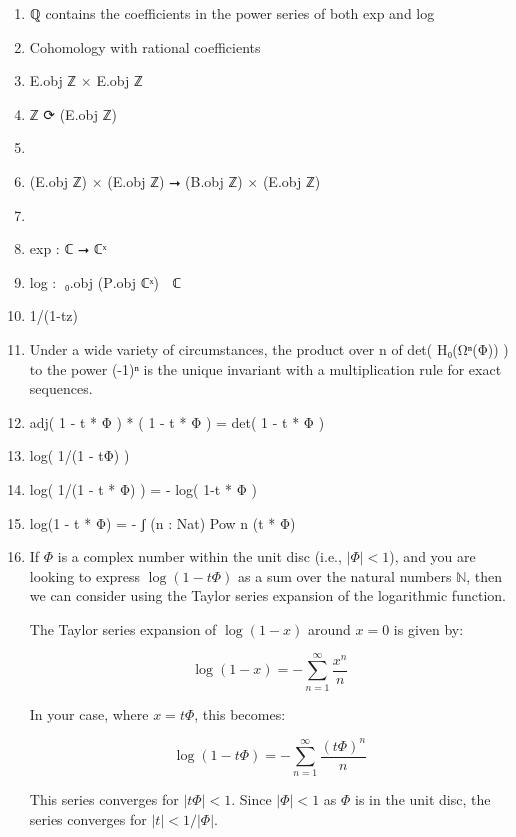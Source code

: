 \documentclass{book}
\begin{document}
\begin{enumerate}
\item ℚ contains the coefficients in the power series of both exp and log
\item Cohomology with rational coefficients
\item E.obj ℤ × E.obj ℤ
\item ℤ ⟳ (E.obj ℤ)
\item 
\item (E.obj ℤ) × (E.obj ℤ) ⭢ (B.obj ℤ) × (E.obj ℤ)
\item 
\item exp : ℂ ⭢ ℂˣ
\item log : π⃡₀.obj (P⃡.obj ℂˣ) ⭢ ℂ
\item 1/(1-tz)
\item Under a wide variety of circumstances, the product over n of det( H₀(Ωⁿ(Φ)) ) to the power (-1)ⁿ is the unique invariant with a multiplication rule for exact sequences.
\item adj( 1 - t * Φ ) * ( 1 - t * Φ ) = det( 1 - t * Φ )
\item log( 1/(1 - tΦ) )
\item log( 1/(1 - t * Φ) ) = - log( 1-t * Φ ) 
\item log(1 - t * Φ) = - ʃ (n : Nat)  Pow n (t * Φ)
\item If \(\Phi\) is a complex number within the unit disc (i.e., \(|\Phi| < 1\)), and you are looking to express \(\log(1 - t\Phi)\) as a sum over the natural numbers \(ℕ\), then we can consider using the Taylor series expansion of the logarithmic function.

The Taylor series expansion of \(\log(1 - x)\) around \(x = 0\) is given by:

\[
\log(1 - x) = -\sum_{n=1}^{\infty} \frac{x^n}{n}
\]

In your case, where \(x = t\Phi\), this becomes:

\[
\log(1 - t\Phi) = -\sum_{n=1}^{\infty} \frac{(t\Phi)^n}{n}
\]

This series converges for \(|t\Phi| < 1\). Since \(|\Phi| < 1\) as \(\Phi\) is in the unit disc, the series converges for \(|t| < 1/|\Phi|\).\\


\end{enumerate}
\end{document}
